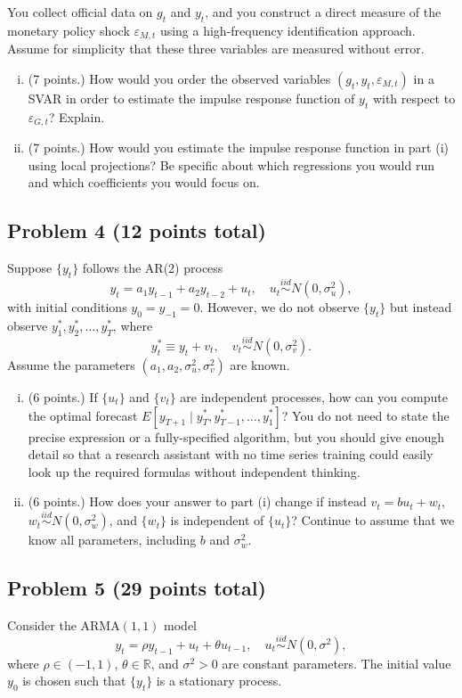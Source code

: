 \documentclass[12pt]{article}
\begin{document}
You collect official data on $g_t$ and $y_t$, and you construct a direct measure of the monetary policy shock $\varepsilon_{M,t}$ using a high-frequency identification approach. Assume for simplicity that these three variables are measured without error.

\begin{enumerate}[i)]
\item (7 points.) How would you order the observed variables $(g_t,y_t,\varepsilon_{M,t})$ in a SVAR in order to estimate the impulse response function of $y_t$ with respect to $\varepsilon_{G,t}$? Explain.
\item (7 points.) How would you estimate the impulse response function in part (i) using local projections? Be specific about which regressions you would run and which coefficients you would focus on.
\end{enumerate}

\subsection*{Problem 4 (12 points total)}
Suppose $\lbrace y_t \rbrace$ follows the AR(2) process
\[y_t = a_1 y_{t-1} + a_2 y_{t-2} + u_t,\quad u_t \overset{iid}{\sim} N(0,\sigma_u^2),\]
with initial conditions $y_0=y_{-1}=0$. However, we do not observe $\lbrace y_t \rbrace$ but instead observe $y_1^*,y_2^*,\dots,y_T^*$, where
\[y_t^* \equiv y_t + v_t,\quad v_t \overset{iid}{\sim} N(0,\sigma_v^2).\]
Assume the parameters $(a_1,a_2,\sigma_u^2,\sigma_v^2)$ are known.

\begin{enumerate}[i)]
\item (6 points.) If $\lbrace u_t \rbrace$ and $\lbrace v_t \rbrace$ are independent processes, how can you compute the optimal forecast $E[y_{T+1} \mid y_T^*,y_{T-1}^*,\dots,y_1^*]$? You do not need to state the precise expression or a fully-specified algorithm, but you should give enough detail so that a research assistant with no time series training could easily look up the required formulas without independent thinking.
\item (6 points.) How does your answer to part (i) change if instead $v_t = b u_t + w_t$, $w_t \overset{iid}{\sim} N(0,\sigma_w^2)$, and $\lbrace w_t \rbrace$ is independent of $\lbrace u_t \rbrace$? Continue to assume that we know all parameters, including $b$ and $\sigma_w^2$.
\end{enumerate}

\subsection*{Problem 5 (29 points total)}
Consider the ARMA$(1,1)$ model
\begin{equation} \label{eqn:arma}
y_t = \rho y_{t-1} + u_t + \theta u_{t-1},\quad u_t \overset{iid}{\sim} N(0,\sigma^2), \tag{$\dagger$}
\end{equation}
where $\rho \in (-1,1)$, $\theta \in \mathbb{R}$, and $\sigma^2>0$ are constant parameters. The initial value $y_0$ is chosen such that $\lbrace y_t \rbrace$ is a stationary process.
\end{document}
